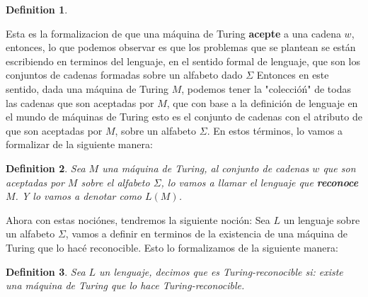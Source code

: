 \documentclass[10pt]{report}
\newtheorem{definition}{Definition}
\begin{document}
{\begin{definition}
\begin{enumerate}
        \end{enumerate}
    \end{definition}
    Esta es la formalizacion de que una máquina de Turing \textbf{acepte} a una cadena $w$,
    entonces, lo que podemos observar es que los problemas que se plantean se están
    escribiendo en terminos del lenguaje, en el sentido formal de lenguaje, que son los
    conjuntos de cadenas formadas sobre un alfabeto dado $\Sigma$
    \newpage
    Entonces en este sentido, dada una máquina de Turing $M$, podemos tener la "coleccióń" de todas
    las cadenas que son aceptadas por $M$, que con base a la definición de lenguaje en el mundo de máquinas de Turing
    esto es el conjunto de cadenas con el atributo de que son aceptadas por $M$, sobre un alfabeto $\Sigma$.
    \newline
    En estos términos, lo vamos a formalizar de la siguiente manera:
    \begin{definition}
        Sea $M$ una máquina de Turing, al conjunto de cadenas $w$ que son aceptadas por $M$ sobre el alfabeto $\Sigma$,
        lo vamos a llamar el lenguaje que \textbf{reconoce} $M$.\newline
        Y lo vamos a denotar como $L(M)$.
    \end{definition}

    Ahora con estas nociónes, tendremos la siguiente noción: \newline Sea $L$ un lenguaje sobre un alfabeto $\Sigma$,
    vamos a definir en terminos de la existencia de una máquina de Turing que lo hacé reconocible.\newline
    Esto lo formalizamos de la siguiente manera: \newline
    \begin{definition}
        Sea $L$ un lenguaje, decimos que es Turing-reconocible si:
        existe una máquina de Turing que lo hace Turing-reconocible.
    \end{definition}

}
\end{document}
